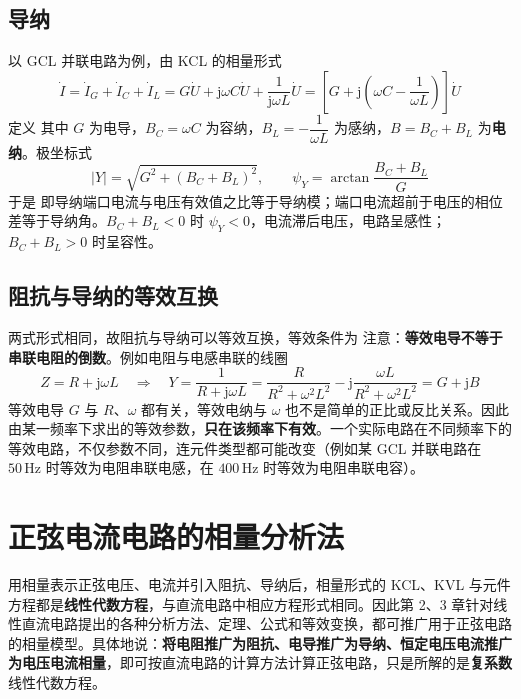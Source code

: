 \subsection{导纳}
以 GCL 并联电路为例，由 KCL 的相量形式
\begin{equation}
\dot{I}=\dot{I}_G+\dot{I}_C+\dot{I}_L
=G\dot{U}+\mathrm{j}\omega C\dot{U}+\frac{1}{\mathrm{j}\omega L}\dot{U}
=\left[G+\mathrm{j}\left(\omega C-\frac{1}{\omega L}\right)\right]\dot{U}
\end{equation}
定义
其中 $G$ 为电导，$B_C=\omega C$ 为容纳，$B_L=-\dfrac{1}{\omega L}$ 为感纳，$B=B_C+B_L$ 为\textbf{电纳}。极坐标式
\begin{equation}
|Y|=\sqrt{G^2+\left(B_C+B_L\right)^2},\qquad \psi_Y=\arctan\frac{B_C+B_L}{G}
\end{equation}
于是
即导纳端口电流与电压有效值之比等于导纳模；端口电流超前于电压的相位差等于导纳角。$B_C+B_L<0$ 时 $\psi_Y<0$，电流滞后电压，电路呈感性；$B_C+B_L>0$ 时呈容性。

\subsection{阻抗与导纳的等效互换}
两式形式相同，故阻抗与导纳可以等效互换，等效条件为
注意：\textbf{等效电导不等于串联电阻的倒数}。例如电阻与电感串联的线圈
\begin{equation}
Z=R+\mathrm{j}\omega L
\quad\Longrightarrow\quad
Y=\frac{1}{R+\mathrm{j}\omega L}=\frac{R}{R^2+\omega^2L^2}
-\mathrm{j}\frac{\omega L}{R^2+\omega^2L^2}=G+\mathrm{j}B
\end{equation}
等效电导 $G$ 与 $R$、$\omega$ 都有关，等效电纳与 $\omega$ 也不是简单的正比或反比关系。因此由某一频率下求出的等效参数，\textbf{只在该频率下有效}。一个实际电路在不同频率下的等效电路，不仅参数不同，连元件类型都可能改变（例如某 GCL 并联电路在 $50\,\mathrm{Hz}$ 时等效为电阻串联电感，在 $400\,\mathrm{Hz}$ 时等效为电阻串联电容）。


\section{正弦电流电路的相量分析法}
用相量表示正弦电压、电流并引入阻抗、导纳后，相量形式的 KCL、KVL 与元件方程都是\textbf{线性代数方程}，与直流电路中相应方程形式相同。因此第 2、3 章针对线性直流电路提出的各种分析方法、定理、公式和等效变换，都可推广用于正弦电路的相量模型。具体地说：\textbf{将电阻推广为阻抗、电导推广为导纳、恒定电压电流推广为电压电流相量}，即可按直流电路的计算方法计算正弦电路，只是所解的是\textbf{复系数}线性代数方程。

